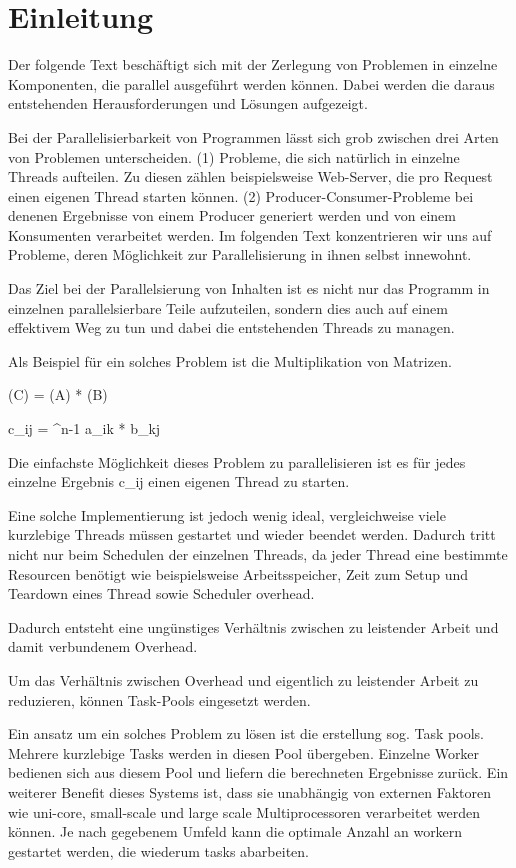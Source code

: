 \section{Einleitung}


Der folgende Text beschäftigt sich mit der Zerlegung von Problemen in einzelne Komponenten, die parallel ausgeführt werden können. Dabei werden die daraus entstehenden Herausforderungen und Lösungen aufgezeigt.

Bei der Parallelisierbarkeit von Programmen lässt sich grob zwischen drei Arten von Problemen unterscheiden. (1) Probleme, die sich natürlich in einzelne Threads aufteilen. Zu diesen zählen beispielsweise Web-Server, die pro Request einen eigenen Thread starten können. (2) Producer-Consumer-Probleme bei denenen Ergebnisse von einem Producer generiert werden und von einem Konsumenten verarbeitet werden. Im folgenden Text konzentrieren wir uns auf Probleme, deren Möglichkeit zur Parallelisierung in ihnen selbst innewohnt.

Das Ziel bei der Parallelsierung von Inhalten ist es nicht nur das Programm in einzelnen parallelsierbare Teile aufzuteilen, sondern dies auch auf einem effektivem Weg zu tun und dabei die entstehenden Threads zu managen.

Als Beispiel für ein solches Problem ist die Multiplikation von Matrizen.

(C) = (A) * (B)

c_ij = ^{n-1} a_ik * b_kj


Die einfachste Möglichkeit dieses Problem zu parallelisieren ist es für jedes einzelne Ergebnis c_ij
einen eigenen Thread zu starten.

Eine solche Implementierung ist jedoch wenig ideal, vergleichweise viele kurzlebige Threads müssen gestartet und wieder beendet werden. Dadurch tritt nicht nur beim Schedulen der einzelnen Threads, da jeder Thread eine bestimmte Resourcen benötigt wie beispielsweise Arbeitsspeicher, Zeit zum Setup und Teardown eines Thread sowie Scheduler overhead.

Dadurch entsteht eine ungünstiges Verhältnis zwischen zu leistender Arbeit und damit verbundenem Overhead.

Um das Verhältnis zwischen Overhead und eigentlich zu leistender Arbeit zu reduzieren, können Task-Pools eingesetzt werden.






Ein ansatz um ein solches Problem zu lösen ist die erstellung sog. Task pools. Mehrere kurzlebige Tasks werden in diesen Pool übergeben. Einzelne Worker bedienen sich aus diesem Pool und liefern die berechneten Ergebnisse zurück. Ein weiterer Benefit dieses Systems ist, dass sie unabhängig von externen Faktoren wie uni-core, small-scale und large scale Multiprocessoren verarbeitet werden können. Je nach gegebenem Umfeld kann die optimale Anzahl an workern gestartet werden, die wiederum tasks abarbeiten.


